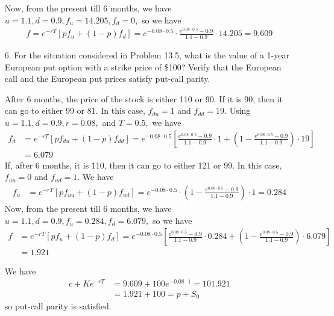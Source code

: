 \documentclass{article}
\begin{document}
\begin{itemize}
\begin{soln}
			Now, from the present till 6 months, we have $u=1.1, d=0.9, f_u=14.205, f_d=0,$ so we have
			\begin{align*}
				f = e^{-rT} [pf_u + (1-p) f_d] = e^{-0.08\cdot 0.5} \cdot \frac{e^{0.08\cdot 0.5}-0.9}{1.1-0.9}\cdot 14.205 = \boxed{9.609}
			\end{align*}
		\end{soln}

	\item[6.] For the situation considered in Problem 13.5, what is the value of a 1-year European put option with a strike price of \$100? Verify that the European call and the European put prices satisfy put-call parity.
		\begin{soln}
			After 6 months, the price of the stock is either 110 or 90. If it is 90, then it can go to either 99 or 81. In this case, $f_{du} = 1$ and $f_{dd}=19.$ Using $u=1.1, d=0.9, r=0.08,$ and $T=0.5,$ we have
			\begin{align*}
				f_d &= e^{-rT}[pf_{du} + (1-p)f_{dd}] = e^{-0.08\cdot 0.5}\left[ \frac{e^{0.08\cdot 0.5}-0.9}{1.1-0.9}\cdot 1 + \left( 1-\frac{e^{0.08\cdot 0.5}-0.9}{1.1-0.9} \right)\cdot 19 \right] \\
				&= 6.079
			\end{align*}
			If, after 6 months, it is 110, then it can go to either 121 or 99. In this case, $f_{uu}=0$ and $f_{ud}=1.$ We have
			\begin{align*}
				f_u &= e^{-rT}[pf_{uu}+(1-p)f_{ud}] = e^{-0.08\cdot 0.5}\cdot \left( 1-\frac{e^{0.08\cdot 0.5}-0.9}{1.1-0.9} \right)\cdot 1 = 0.284
			\end{align*}
			Now, from the present till 6 months, we have $u=1.1, d=0.9, f_u = 0.284, f_d=6.079,$ so we have
			\begin{align*}
				f &= e^{-rT}[pf_u + (1-p)f_d] = e^{-0.08\cdot 0.5}\left[ \frac{e^{0.08\cdot 0.5}-0.9}{1.1-0.9}\cdot 0.284 + \left( 1-\frac{e^{0.08\cdot 0.5}-0.9}{1.1-0.9} \right)\cdot 6.079 \right] \\
				&= \boxed{1.921}
			\end{align*}

			We have
			\begin{align*}
				c + Ke^{-rT} &= 9.609 + 100e^{-0.08\cdot 1} = 101.921 \\
				&= 1.921 + 100 = p + S_0
			\end{align*}
			so put-call parity is satisfied.
		\end{soln}


\end{itemize}
\end{document}
